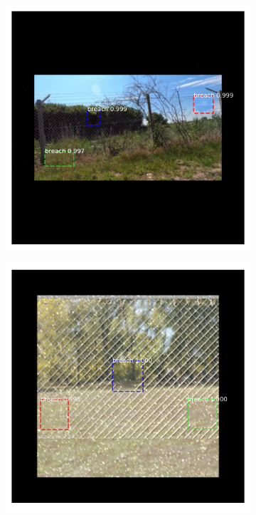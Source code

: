 \documentclass[../Head/Main.tex]{subfiles}
\begin{document}
\begin{figure}[H]
    \centering
    \begin{subfigure}{.24\textwidth}
        \centering
        \includegraphics[width=\textwidth]{../Figures/rcnn_results/found_breaches/good_performance/9.png}
        \caption{}
    \end{subfigure}
    \hfill
    \begin{subfigure}{.24\textwidth}
        \centering
        \includegraphics[width=\textwidth]{../Figures/rcnn_results/found_breaches/good_performance/11.png}

\end{subfigure}
\end{figure}
\end{document}
